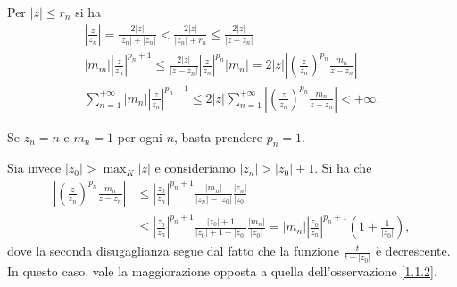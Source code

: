 \begin{oss} \label{1.1.2}
  Per $|z| \le r_n$ si ha
  \begin{gather*}
    \left|\frac{z}{z_n}\right|=\frac{2|z|}{|z_n|+|z_n|}<\frac{2|z|}{|z_n|+r_n} \le \frac{2|z|}{|z-z_n|} \\
    |m_m| \left|\frac{z}{z_n}\right|^{p_n+1} \le \frac{2|z|}{|z-z_n|}\left|\frac{z}{z_n}\right|^{p_n}|m_n|=2|z|\left|\left(\frac{z}{z_n}\right)^{p_n}\frac{m_n}{z-z_n}\right| \\
    \sum_{n=1}^{+\infty} |m_n|\left|\frac{z}{z_n}\right|^{p_n+1} \le 2|z|\sum_{n=1}^{+\infty} \left|\left(\frac{z}{z_n}\right)^{p_n}\frac{m_n}{z-z_n}\right|<+\infty.
  \end{gather*}
\end{oss}

\begin{ex}
  Se $z_n=n$ e $m_n=1$ per ogni $n$, basta prendere $p_n=1$.

  Sia invece $\displaystyle |z_0|>\max_K |z|$ e consideriamo $|z_n|>|z_0|+1$. Si ha che
  \begin{align*}
    \left|\left(\frac{z}{z_n}\right)^{p_n}\frac{m_n}{z-z_n}\right| & \le \left|\frac{z_0}{z_n}\right|^{p_n+1}\frac{|m_n|}{|z_n|-|z_0|}\frac{|z_n|}{|z_0|} \\
    & \le \left|\frac{z_0}{z_n}\right|^{p_n+1}\frac{|z_0|+1}{|z_0|+1-|z_0|}\frac{|m_n|}{|z_0|}=|m_n|\left|\frac{z_0}{z_n}\right|^{p_n+1}\left(1+\frac{1}{|z_0|}\right),
  \end{align*}
  dove la seconda disugaglianza segue dal fatto che la funzione $\frac{t}{t-|z_0|}$ è decrescente. In questo caso, vale la maggiorazione opposta a quella dell'osservazione \ref{1.1.2}.
\end{ex}

